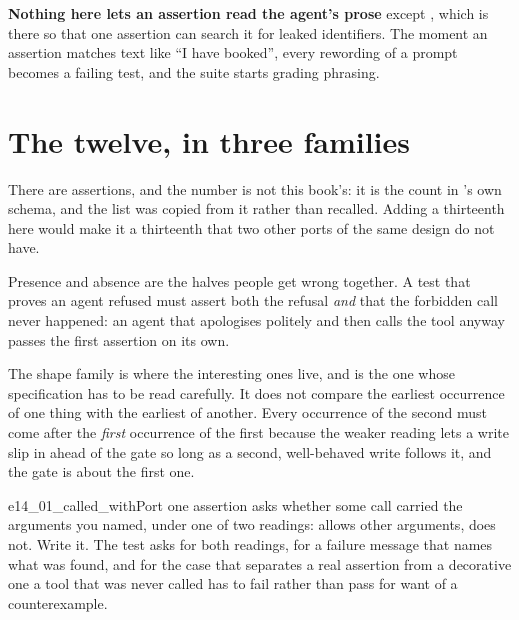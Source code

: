 \textbf{Nothing here lets an assertion read the agent's prose} except
, which is there so that one assertion can search it for
leaked identifiers. The moment an assertion matches text like
\enquote{I have booked}, every rewording of a prompt becomes a failing
test, and the suite starts grading phrasing.

\section{The twelve, in three families}
\label{sec:ch14-twelve}

There are  assertions, and the number is not this
book's: it is the count in 's own schema, and the
list was copied from it rather than recalled. Adding a thirteenth here
would make it a thirteenth that two other ports of the same design do not
have.


\noindent
Presence and absence are the halves people get wrong together. A test that
proves an agent refused must assert both the refusal \emph{and} that the
forbidden call never happened: an agent that apologises politely and then
calls the tool anyway passes the first assertion on its own.


\noindent
The shape family is where the interesting ones live, and  is
the one whose specification has to be read carefully. It does not compare
the earliest occurrence of one thing with the earliest of another. Every
occurrence of the second must come after the \emph{first} occurrence of the
first \dash{} because the weaker reading lets a write slip in ahead of the
gate so long as a second, well-behaved write follows it, and the gate is
about the first one.


\begin{exercise}{e14_01_called_with}{Port one assertion}
 asks whether some call carried the arguments you
named, under one of two readings:  allows other arguments,
 does not. Write it. The test asks for both readings, for a
failure message that names what was found, and for the case that separates
a real assertion from a decorative one \dash{} a tool that was never called
has to fail rather than pass for want of a counterexample.
\end{exercise}

